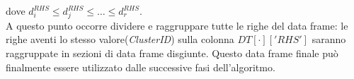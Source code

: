 dove $d^{RHS}_i \leq d^{RHS}_j \leq \ldots \leq d^{RHS}_r$. \\
A questo punto occorre dividere e raggruppare tutte le righe del data frame: le righe aventi lo stesso valore(\textit{ClusterID}) sulla colonna $DT[\cdot]['RHS']$ saranno raggruppate in sezioni di data frame disgiunte. 
Questo data frame finale può finalmente essere utilizzato dalle successive fasi dell'algoritmo.